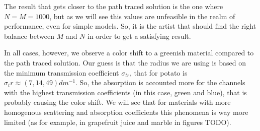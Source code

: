 The result that gets closer to the path traced solution is the one where $N = M = 1000$, but as we will see this values are unfeasible in the realm of performance, even for simple models. So, it is the artist that should find the right balance between $M$ and $N$ in order to get a satisfying result. 

In all cases, however, we observe a color shift to a greenish material compared to the path traced solution. Our guess is that the radius we are using is based on the minimum transmission coefficient $\sigma_{tr}$, that for potato is $\sigma_tr \approx (7, 14, 49) dm^{-1}$. So, the absorption is accounted more for the channels with the highest transmission coefficients (in this case, green and blue), that is probably causing the color shift. We will see that for materials with more homogenous scattering and absorption coefficients this phenomena is way more limited (as for example, in grapefruit juice and marble in figures TODO).


